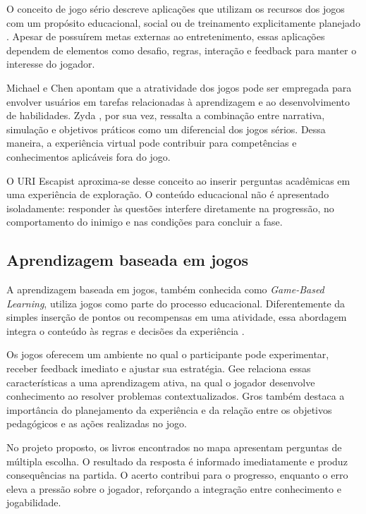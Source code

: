 \documentclass[12pt]{article}
\begin{document}
O conceito de jogo sério descreve aplicações que utilizam os recursos dos jogos com um propósito educacional, social ou de treinamento explicitamente planejado \cite{abt1970}. Apesar de possuírem metas externas ao entretenimento, essas aplicações dependem de elementos como desafio, regras, interação e feedback para manter o interesse do jogador.

Michael e Chen \cite{michael2006} apontam que a atratividade dos jogos pode ser empregada para envolver usuários em tarefas relacionadas à aprendizagem e ao desenvolvimento de habilidades. Zyda \cite{zyda2005}, por sua vez, ressalta a combinação entre narrativa, simulação e objetivos práticos como um diferencial dos jogos sérios. Dessa maneira, a experiência virtual pode contribuir para competências e conhecimentos aplicáveis fora do jogo.

O URI Escapist aproxima-se desse conceito ao inserir perguntas acadêmicas em uma experiência de exploração. O conteúdo educacional não é apresentado isoladamente: responder às questões interfere diretamente na progressão, no comportamento do inimigo e nas condições para concluir a fase.

\subsection{Aprendizagem baseada em jogos}

A aprendizagem baseada em jogos, também conhecida como \textit{Game-Based Learning}, utiliza jogos como parte do processo educacional. Diferentemente da simples inserção de pontos ou recompensas em uma atividade, essa abordagem integra o conteúdo às regras e decisões da experiência \cite{prensky2001}.

Os jogos oferecem um ambiente no qual o participante pode experimentar, receber feedback imediato e ajustar sua estratégia. Gee \cite{gee2003} relaciona essas características a uma aprendizagem ativa, na qual o jogador desenvolve conhecimento ao resolver problemas contextualizados. Gros \cite{gros2007} também destaca a importância do planejamento da experiência e da relação entre os objetivos pedagógicos e as ações realizadas no jogo.

No projeto proposto, os livros encontrados no mapa apresentam perguntas de múltipla escolha. O resultado da resposta é informado imediatamente e produz consequências na partida. O acerto contribui para o progresso, enquanto o erro eleva a pressão sobre o jogador, reforçando a integração entre conhecimento e jogabilidade.
\end{document}
